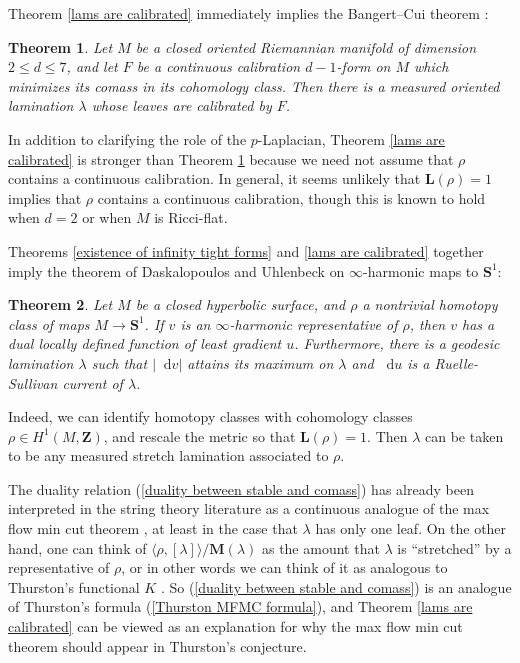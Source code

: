 \documentclass[reqno,11pt]{amsart}
\newcommand{\ZZ}{\mathbf{Z}}
\newcommand{\Sph}{\mathbf S}
\newcommand*\dif{\mathop{}\!\mathrm{d}}
\newcommand{\Mass}{\mathbf M}
\newcommand{\Comass}{\mathbf L}
\newtheorem{theorem}{Theorem}[section]
\theoremstyle{definition}
\numberwithin{equation}{section}
\begin{document}
Theorem \ref{lams are calibrated} immediately implies the Bangert--Cui theorem \cite{bangert_cui_2017}:

\begin{theorem}\label{Bangert MFMC}
Let $M$ be a closed oriented Riemannian manifold of dimension $2 \leq d \leq 7$, and let $F$ be a continuous calibration $d - 1$-form on $M$ which minimizes its comass in its cohomology class.
Then there is a measured oriented lamination $\lambda$ whose leaves are calibrated by $F$.
\end{theorem}

In addition to clarifying the role of the $p$-Laplacian, Theorem \ref{lams are calibrated} is stronger than Theorem \ref{Bangert MFMC} because we need not assume that $\rho$ contains a continuous calibration.
In general, it seems unlikely that $\Comass(\rho) = 1$ implies that $\rho$ contains a continuous calibration, though this is known to hold when $d = 2$ \cite{Evans08} or when $M$ is Ricci-flat. 

Theorems \ref{existence of infinity tight forms} and \ref{lams are calibrated} together imply the theorem of Daskalopoulos and Uhlenbeck \cite{daskalopoulos2020transverse} on $\infty$-harmonic maps to $\Sph^1$:

\begin{theorem}\label{Daskalopolous MFMC}
Let $M$ be a closed hyperbolic surface, and $\rho$ a nontrivial homotopy class of maps $M \to \Sph^1$.
If $v$ is an $\infty$-harmonic representative of $\rho$, then $v$ has a dual locally defined function of least gradient $u$.
Furthermore, there is a geodesic lamination $\lambda$ such that $|\dif v|$ attains its maximum on $\lambda$ and $\dif u$ is a Ruelle-Sullivan current of $\lambda$.
\end{theorem}

Indeed, we can identify homotopy classes with cohomology classes $\rho \in H^1(M, \ZZ)$, and rescale the metric so that $\Comass(\rho) = 1$.
Then $\lambda$ can be taken to be any measured stretch lamination associated to $\rho$.

The duality relation (\ref{duality between stable and comass}) has already been interpreted in the string theory literature as a continuous analogue of the max flow min cut theorem \cite{Freedman_2016}, at least in the case that $\lambda$ has only one leaf.
On the other hand, one can think of $\langle \rho, [\lambda]\rangle/\Mass(\lambda)$ as the amount that $\lambda$ is ``stretched'' by a representative of $\rho$, or in other words we can think of it as analogous to Thurston's functional $K$ \cite[\S5.3]{daskalopoulos2020transverse}.
So (\ref{duality between stable and comass}) is an analogue of Thurston's formula (\ref{Thurston MFMC formula}), and Theorem \ref{lams are calibrated} can be viewed as an explanation for why the max flow min cut theorem should appear in Thurston's conjecture.
\end{document}
